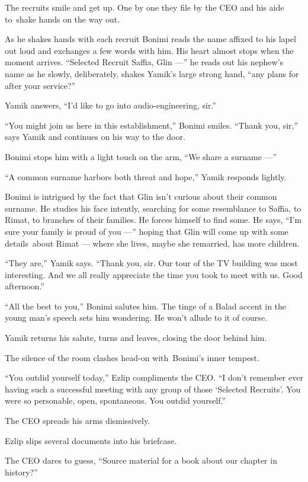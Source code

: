 \documentclass[twoside,11pt,openany]{book}
\begin{document}
The recruits smile and get up. One by one they file by the CEO and his aide to~shake hands on the way out.

As he shakes hands with each recruit Bonimi reads the name affixed to his lapel out loud and exchanges a few words
with him. His heart almost stops when the moment arrives. ``Selected Recruit Saffia, Glin ---'' he reads out his nephew's
name as he slowly, deliberately, shakes Yamik's large strong{ }hand, ``any
plans for after your service?''

Yamik answers, ``I'd like to go into audio-engineering, sir.''

``You might join us here in this establishment,'' Bonimi smiles. ``Thank you,
sir,'' says Yamik and continues on his way to the door.

Bonimi{ }stops{ }him with a light touch on the arm, ``We share a surname ---''

``A common surname harbors both threat and hope,'' Yamik responds lightly.

Bonimi is intrigued by the fact that Glin isn't curious about their common surname. He studies his face intently,
searching for some resemblance to Saffia, to Rimat, to branches of their families. He forces himself to find some. He
says, ``I'm sure your family{ }is proud of you ---'' hoping that Glin will
come up with some details~about Rimat --- where she lives, maybe she remarried, has more children.

``They are,'' Yamik says. ``Thank you, sir. Our tour of the TV building was most
interesting. And we all really appreciate the time you took to meet with us. Good afternoon.''

``All the best to you,'' Bonimi salutes him. The tinge of a Balad accent in the young man's
speech sets him wondering. He won't allude to it of course.

Yamik returns his salute, turns and leaves, closing the door behind him.

The silence of the room clashes head-on with~Bonimi's inner tempest.

``You outdid yourself today,'' Ezlip compliments the CEO. ``I don't remember
ever having such a successful meeting with any group of those `Selected Recruits'. You were so personable, open,
spontaneous. You outdid yourself.''

The CEO spreads his arms dismissively.

Ezlip slips several documents into his briefcase.\textbf{ }

The CEO dares to guess, ``Source material for a book about our chapter in history?''
\end{document}
